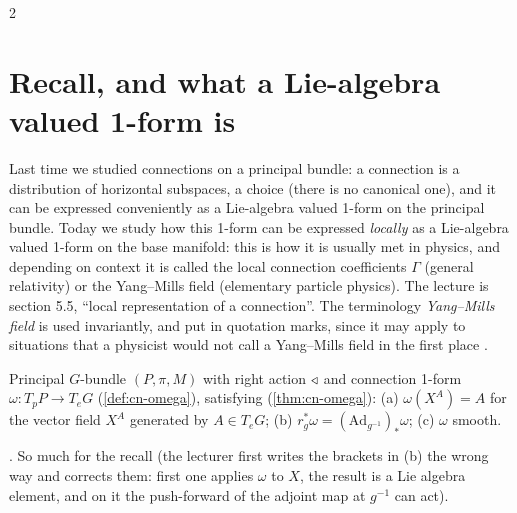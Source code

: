 \begin{paracol}{2}
\section{Recall, and what a Lie-algebra valued 1-form is}\label{sec:ym-recall}

Last time we studied connections on a principal bundle: a connection is a distribution of horizontal subspaces, a choice (there is no canonical one), and it can be expressed conveniently as a Lie-algebra valued 1-form on the principal bundle. Today we study how this 1-form can be expressed \emph{locally} as a Lie-algebra valued 1-form on the base manifold: this is how it is usually met in physics, and depending on context it is called the local connection coefficients $\Gamma$ (general relativity) or the Yang--Mills field (elementary particle physics). The lecture is section 5.5, ``local representation of a connection''. The terminology \emph{Yang--Mills field} is used invariantly, and put in quotation marks, since it may apply to situations that a physicist would not call a Yang--Mills field in the first place     .
\begin{recall}
Principal $G$-bundle $(P,\pi,M)$ with right action $\mathbin{\triangleleft}$ and connection 1-form $\omega\colon T_pP\to T_eG$ (\cref{def:cn-omega}), satisfying (\cref{thm:cn-omega}): (a) $\omega(X^A)=A$ for the vector field $X^A$ generated by $A\in T_eG$; (b) $r_g^*\omega=(\mathrm{Ad}_{g^{-1}})_*\omega$; (c) $\omega$ smooth.
\end{recall}
      . So much for the recall (the lecturer first writes the brackets in (b) the wrong way and corrects them: first one applies $\omega$ to $X$, the result is a Lie algebra element, and on it the push-forward of the adjoint map at $g^{-1}$ can act).


\end{paracol}
